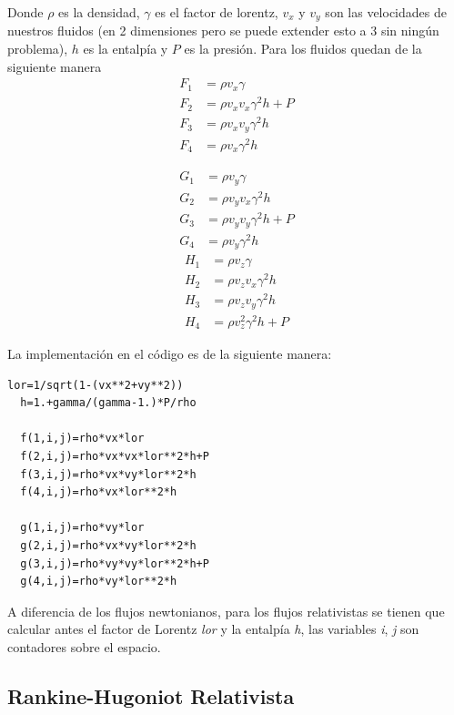 \documentclass[12pt,a4paper]{book}
\begin{document}
Donde $\rho$ es la densidad, $\gamma$ es el factor de lorentz, $v_{x}$ y $v_{y}$ son las velocidades de nuestros fluidos (en 2 dimensiones pero se puede extender esto a 3 sin ningún problema), $h$ es la entalpía  y $P$ es la presión. Para los fluidos quedan de la siguiente manera
\begin{align}
F_{1}& = \rho v_{x} \gamma \\ 
F_{2}& = \rho v_{x} v_{x} \gamma^{2} h + P\\ 
F_{3}& = \rho v_{x} v_{y} \gamma^{2} h \\ 
F_{4}& = \rho v_{x} \gamma^{2} h 
\end{align}

\begin{align}
G_{1}& = \rho v_{y} \gamma \\ 
G_{2}& = \rho v_{y} v_{x} \gamma^{2} h \\ 
G_{3}& = \rho v_{y} v_{y} \gamma^{2} h + P\\ 
G_{4}& = \rho v_{y} \gamma^{2} h
\end{align}
\begin{align}
H_{1}& = \rho v_{z} \gamma \\ 
H_{2}& = \rho v_{z} v_{x} \gamma^{2} h \\ 
H_{3}& = \rho v_{z} v_{y} \gamma^{2} h \\ 
H_{4}& = \rho v_{z}^{2} \gamma^{2} h + P
\end{align}

La implementación en el código es de la siguiente manera:

\begin{lstlisting}[frame=single]
  lor=1/sqrt(1-(vx**2+vy**2))
  h=1.+gamma/(gamma-1.)*P/rho
  
  f(1,i,j)=rho*vx*lor
  f(2,i,j)=rho*vx*vx*lor**2*h+P
  f(3,i,j)=rho*vx*vy*lor**2*h
  f(4,i,j)=rho*vx*lor**2*h

  g(1,i,j)=rho*vy*lor
  g(2,i,j)=rho*vx*vy*lor**2*h
  g(3,i,j)=rho*vy*vy*lor**2*h+P
  g(4,i,j)=rho*vy*lor**2*h

\end{lstlisting}

A diferencia de los flujos newtonianos, para los flujos relativistas se tienen que calcular antes el factor de Lorentz \emph{lor} y la entalpía \emph{h},
las variables \emph{i}, \emph{j} son contadores sobre el espacio.


\subsection{Rankine-Hugoniot Relativista}
\end{document}
